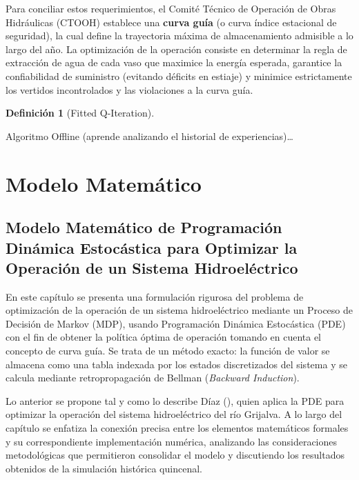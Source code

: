 \documentclass[
  spanish,
  letterpaper,
]{scrreprt}
\theoremstyle{definition}
\newtheorem{definition}{Definición}[chapter]
\theoremstyle{remark}
\begin{document}
Para conciliar estos requerimientos, el Comité Técnico de Operación de
Obras Hidráulicas (CTOOH) establece una \textbf{curva guía} (o curva
índice estacional de seguridad), la cual define la trayectoria máxima de
almacenamiento admisible a lo largo del año. La optimización de la
operación consiste en determinar la regla de extracción de agua de cada
vaso que maximice la energía esperada, garantice la confiabilidad de
suministro (evitando déficits en estiaje) y minimice estrictamente los
vertidos incontrolados y las violaciones a la curva guía.

\begin{definition}[Fitted
Q-Iteration]\protect\hypertarget{def-sub}{}\label{def-sub}

Algoritmo Offline (aprende analizando el historial de
experiencias)\ldots{}

\end{definition}

\part{Modelo Matemático}

\chapter{Modelo Matemático de Programación Dinámica Estocástica para
Optimizar la Operación de un Sistema
Hidroeléctrico}\label{modelo-matemuxe1tico-de-programaciuxf3n-dinuxe1mica-estocuxe1stica-para-optimizar-la-operaciuxf3n-de-un-sistema-hidroeluxe9ctrico}

En este capítulo se presenta una formulación rigurosa del problema de
optimización de la operación de un sistema hidroeléctrico mediante un
Proceso de Decisión de Markov (MDP), usando Programación Dinámica
Estocástica (PDE) con el fin de obtener la política óptima de operación
tomando en cuenta el concepto de curva guía. Se trata de un método
exacto: la función de valor se almacena como una tabla indexada por los
estados discretizados del sistema y se calcula mediante retropropagación
de Bellman (\emph{Backward Induction}).

Lo anterior se propone tal y como lo describe Díaz
(), quien aplica la PDE para optimizar
la operación del sistema hidroeléctrico del río Grijalva. A lo largo del
capítulo se enfatiza la conexión precisa entre los elementos matemáticos
formales y su correspondiente implementación numérica, analizando las
consideraciones metodológicas que permitieron consolidar el modelo y
discutiendo los resultados obtenidos de la simulación histórica
quincenal.
\end{document}
